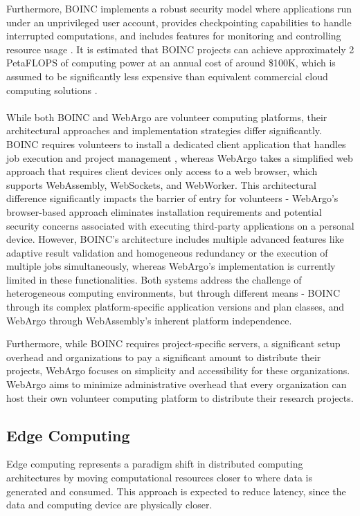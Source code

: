 Furthermore, \ac{BOINC} implements a robust security model where applications run under an unprivileged user account, provides checkpointing capabilities to handle interrupted computations, and includes features for monitoring and controlling resource usage \cite{relatedwork:boinc1}. It is estimated that \ac{BOINC} projects can achieve approximately 2 Peta\ac{FLOPS} of computing power at an annual cost of around \$100K, which is assumed to be significantly less expensive than equivalent commercial cloud computing solutions  \cite{relatedwork:boinc1}.
\\~\\
While both \ac{BOINC} and WebArgo are volunteer computing platforms, their architectural approaches and implementation strategies differ significantly. \ac{BOINC} requires volunteers to install a dedicated client application that handles job execution and project management \cite{relatedwork:boinc1}, whereas WebArgo takes a simplified web approach that requires client devices only access to a web browser, which supports WebAssembly, WebSockets, and WebWorker. This architectural difference significantly impacts the barrier of entry for volunteers - WebArgo's browser-based approach eliminates installation requirements and potential security concerns associated with executing third-party applications on a personal device. However, \ac{BOINC}'s architecture includes multiple advanced features like adaptive result validation and homogeneous redundancy or the execution of multiple jobs simultaneously, whereas WebArgo's implementation is currently limited in these functionalities. Both systems address the challenge of heterogeneous computing environments, but through different means - \ac{BOINC} through its complex platform-specific application versions and plan classes, and WebArgo through WebAssembly's inherent platform independence.

Furthermore, while \ac{BOINC} requires project-specific servers, a significant setup overhead and organizations to pay a significant amount to distribute their projects, WebArgo focuses on simplicity and accessibility for these organizations. WebArgo aims to minimize administrative overhead that every organization can host their own volunteer computing platform to distribute their research projects.

\subsection{Edge Computing}
Edge computing represents a paradigm shift in distributed computing architectures by moving computational resources closer to where data is generated and consumed. This approach is expected to reduce latency, since the data and computing device are physically closer. 

